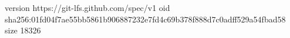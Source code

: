 version https://git-lfs.github.com/spec/v1
oid sha256:01fd04f7ae55bb5861b906887232e7fd4c69b378f888d7c0adff529a54fbad58
size 18326

